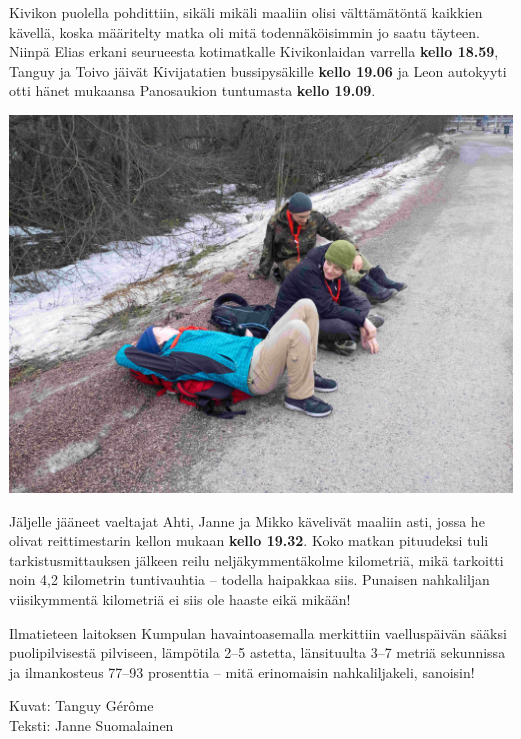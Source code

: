 \begin{multicols}{2}
	Kivikon puolella pohdittiin, sikäli mikäli maaliin olisi välttämätöntä
	kaikkien kävellä, koska määritelty matka oli mitä todennäköisimmin jo
	saatu täyteen. Niinpä Elias erkani seurueesta kotimatkalle
	Kivikonlaidan varrella \textbf{kello 18.59}, Tanguy ja Toivo jäivät
	Kivijatatien bussipysäkille \textbf{kello 19.06} ja Leon autokyyti otti
	hänet mukaansa Panosaukion tuntumasta \textbf{kello 19.09}.

	\begin{center}
	\includegraphics[width=\linewidth]{assets/nahkaliljaviikki}
	\end{center}

	Jäljelle jääneet vaeltajat Ahti, Janne ja Mikko kävelivät maaliin asti,
	jossa he olivat reittimestarin kellon mukaan \textbf{kello 19.32}. Koko
	matkan pituudeksi tuli tarkistusmittauksen jälkeen reilu
	neljäkymmentäkolme kilometriä, mikä tarkoitti noin 4,2 kilometrin
	tuntivauhtia – todella haipakkaa siis. Punaisen nahkaliljan
	viisikymmentä kilometriä ei siis ole haaste eikä mikään!

	Ilmatieteen laitoksen Kumpulan havaintoasemalla merkittiin
	vaelluspäivän sääksi puolipilvisestä pilviseen, lämpötila 2–5 astetta,
	länsituulta 3–7 metriä sekunnissa ja ilmankosteus 77–93 prosenttia –
	mitä erinomaisin nahkaliljakeli, sanoisin!\\

	\vspace*{0.50cm}

	\raggedleft Kuvat: Tanguy Gérôme\\
	\raggedleft Teksti: Janne Suomalainen

\end{multicols}

